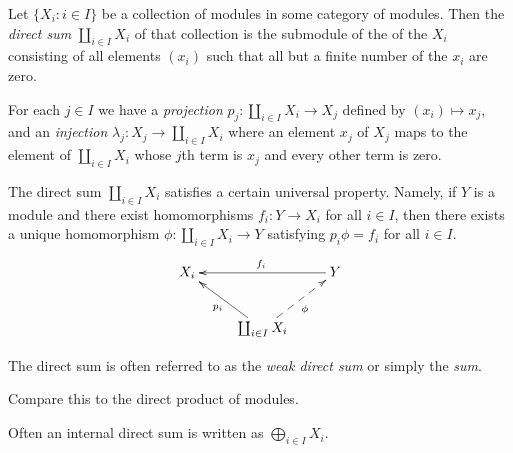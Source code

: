 \documentclass{article}
\begin{document}
Let $\{ X_i : i \in I \}$ be a collection of modules 
in some category of modules.
Then the {\it direct sum} $\coprod_{i \in I} X_i$
of that collection is the submodule
of the  of the $X_i$
consisting of all elements $(x_i)$
such that all but a finite number
of the $x_i$ are zero.

For each $j \in I$ we have
a {\it projection} $p_j : \coprod_{i \in I} X_i \to X_j$
defined by $(x_i) \mapsto x_j$,
and
an {\it injection} $\lambda_j : X_j \to \coprod_{i \in I} X_i$
where an element $x_j$ of $X_j$
maps to the element of $\coprod_{i \in I} X_i$
whose $j$th term is $x_j$ and every other term is zero.

The direct sum $\coprod_{i \in I} X_i$
satisfies a certain universal property.
Namely, if $Y$ is a module
and there exist homomorphisms $f_i : Y \to X_i$
for all $i \in I$,
then there exists a unique homomorphism
$\phi : \coprod_{i \in I} X_i \to Y$
satisfying $p_i \phi = f_i$ for all $i \in I$.
$$
\xymatrix{
  X_i
  &
  &
  Y
        \ar[ll]_{f_i}
  \\
  &
  \coprod_{i \in I} X_i
        \ar[ul]^{p_i}
        \ar@{-->}[ur]_{\phi}
}
$$

The direct sum is often referred to
as the {\it weak direct sum}
or simply the {\it sum}.

Compare this to the direct product of modules.

Often an internal direct sum is written as $\bigoplus_{i \in I} X_i$.
\end{document}
